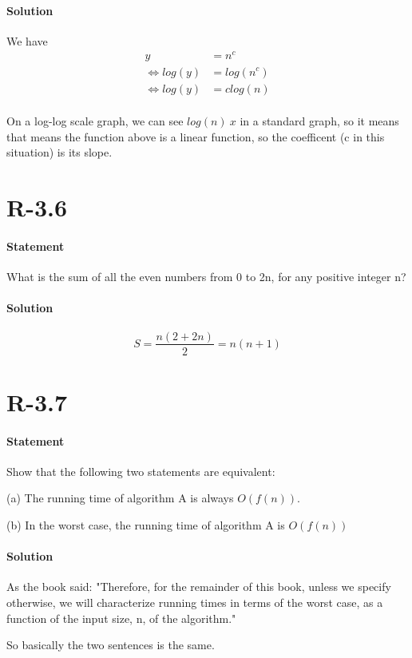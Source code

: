 \documentclass{article}
\begin{document}
\paragraph{Solution}
  We have
  \begin{align*}
      y &= n^c \\
      \Leftrightarrow log(y) &= log(n^c)\\
      \Leftrightarrow log(y) &= clog(n)
  \end{align*}
\paragraph{}
  On a log-log scale graph, we can see $log(n) ~ x$ in a standard graph, so it means that means the function above is a linear function, so the coefficent (c in this situation) is its slope.
\section{R-3.6}
\paragraph{Statement}
What is the sum of all the even numbers from 0 to 2n, for any positive
integer n?
\paragraph{Solution}
  \begin{equation}
    {S} = \frac{n(2+2n)}{2} = {n(n+1)}
  \end{equation}
\section{R-3.7}
\paragraph{Statement}
\setlength{\parindent}{14ex}
Show that the following two statements are equivalent:
\par(a) The running time of algorithm A is always $O(f(n))$.
\par(b) In the worst case, the running time of algorithm A is $O(f(n))$
\setlength{\parindent}{12ex}
\paragraph{Solution}
  As the book said: "Therefore, for the remainder of this book, unless we specify
  otherwise, we will characterize running times in terms of the worst case, as a function of the input size, n, of the algorithm."\par
  So basically the two sentences is the same.
\setlength{\parindent}{0pt}
\end{document}
